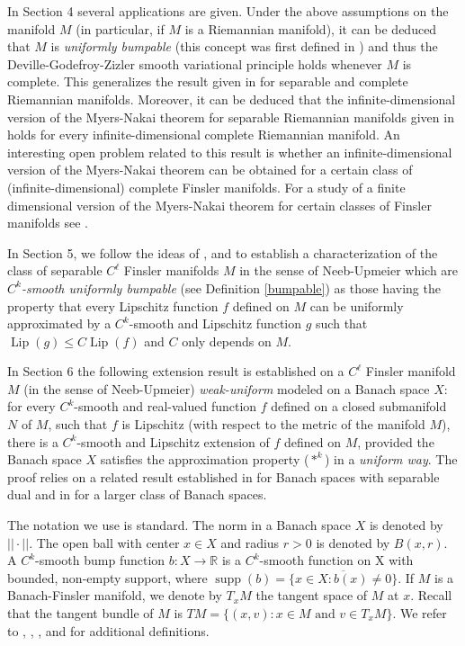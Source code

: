 \documentclass[11pt]{amsart}
\numberwithin{equation}{section}
\begin{document}
 In Section 4 several applications are given. Under the above assumptions on the manifold $M$ (in particular, if $M$ is a Riemannian manifold), it can be  deduced that $M$ is {\em uniformly bumpable}  (this concept was first defined in \cite{AzFeMe})  and thus the Deville-Godefroy-Zizler smooth variational principle  holds whenever $M$ is complete. This generalizes the result given in \cite{AzFeMe} for separable and complete Riemannian manifolds. Moreover, it can be deduced that the infinite-dimensional version of the Myers-Nakai theorem for separable Riemannian manifolds given in \cite{GaJaRa} holds for every infinite-dimensional complete Riemannian manifold. An interesting open problem related to this result is whether an infinite-dimensional version of the Myers-Nakai theorem can be obtained for a certain class of (infinite-dimensional) complete Finsler manifolds.
 For a study of a finite dimensional version of the Myers-Nakai theorem for certain classes of Finsler manifolds see  \cite{Rangel-Tesis}.

 In Section 5, we follow the ideas of \cite{Fry1}, \cite{azafrymon} and \cite{HajekJohanis} to establish a characterization of the class of separable $C^\ell$ Finsler manifolds $M$ in the sense of Neeb-Upmeier which are  {\em $C^k$-smooth uniformly bumpable}
 (see Definition \ref{bumpable})  as those having the property that
 every   Lipschitz  function $f$ defined on $M$ can be uniformly approximated by a  $C^k$-smooth and Lipschitz
 function $g$ such that ${\operatorname{Lip}}(g)\le C {\operatorname{Lip}}(f)$ and $C$ only depends on $M$.

 In Section 6 the following extension result is established on a $C^\ell$ Finsler manifold $M$ (in the sense of Neeb-Upmeier) {\em weak-uniform} modeled on a Banach space $X$: for every $C^k$-smooth and real-valued function $f$ defined on a closed submanifold $N$ of $M$, such that $f$ is Lipschitz (with respect to the metric of the manifold $M$),  there is a $C^k$-smooth and Lipschitz extension of $f$ defined on $M$,  provided  the Banach space $X$ satisfies the approximation property ($*^k$) in a {\em uniform way}. The proof relies on a related result established in \cite{Azafrykeener} for Banach spaces with separable dual and in  \cite{MarLuis} for a larger class of Banach spaces.
\smallskip

The notation we use is standard. The norm in a Banach space $X$ is denoted by $||\cdot||$.  The open ball with center $x\in X$ and radius $r>0$ is denoted by $B(x,r)$. A $C^k$-smooth bump function $b:X\to {\mathbb{R}}$ is a $C^k$-smooth function on X with bounded, non-empty support, where ${\operatorname{supp}}(b) =\overline{\{x \in  X : b(x)\neq 0\}}$.
If $M$ is a Banach-Finsler manifold, we denote by $T_xM$ the tangent space of $M$ at $x$. Recall that the tangent bundle of $M$ is $TM=\{(x,v):x\in M \text{ and } v\in T_x M\}$. We refer to \cite{Deville}, \cite{fabianhajek}, \cite{Lang}, \cite{Deim} and \cite{Upmeier}  for additional definitions.
\end{document}
